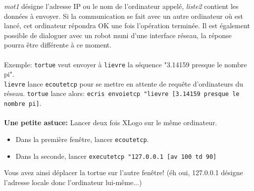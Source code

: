 \textit{mot1} désigne l'adresse IP ou le nom de l'ordinateur appelé, \textit{liste2} contient les données à envoyer. Si la communication se fait avec un autre ordinateur où \xlogo est lancé, cet ordinateur répondra OK une fois l'opération terminée. Il est également possible de dialoguer avec un robot muni d'une interface réseau, la réponse pourra être différente à ce moment.\\ \\
Exemple: \texttt{tortue} veut envoyer à  \texttt{lievre} la séquence "3.14159 presque le nombre pi".\\
\texttt{lievre} lance \texttt{ecoutetcp} pour se mettre en attente de requête d'ordinateurs du réseau. \texttt{tortue} lance alors: \texttt{ecris~envoietcp~"lievre~[3.14159 presque le nombre pi]}.\\ \\
\textbf{Une petite astuce:} Lancer deux fois XLogo sur le même ordinateur.
\begin{itemize}
 \item Dans la première fenêtre, lancer \texttt{ecoutetcp}.
 \item Dans la seconde, lancer \texttt{executetcp "127.0.0.1 [av 100 td 90]}
\end{itemize}

Vous avez ainsi déplacer la tortue sur l'autre fenêtre! (éh oui, 127.0.0.1 désigne l'adresse locale donc l'ordinateur lui-même...)
